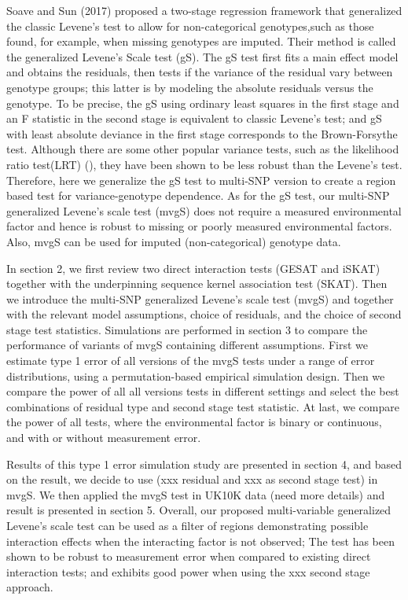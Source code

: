 \documentclass{article}
\begin{document}
	
	Soave and Sun (2017) proposed a two-stage regression framework that generalized the classic Levene's test to allow for non-categorical genotypes,such as those found, for example, when missing genotypes are imputed. Their method is called the generalized Levene's Scale test (gS). The gS test first fits a main effect model and obtains the residuals, then tests if the variance of the residual vary between genotype groups; this latter is by modeling the absolute residuals versus the genotype.  To be precise, the gS using ordinary least squares in the first stage and an F statistic in the second stage is equivalent to classic Levene's test; and gS with least absolute deviance  in the first stage corresponds to the Brown-Forsythe test. Although there are some other popular variance tests, such as the likelihood ratio test(LRT) (\cite{cao2014versatile}), they have been shown to be less robust than the Levene's test. Therefore, here we generalize the gS test to multi-SNP version to create a region based test for variance-genotype dependence. As for the gS test, our multi-SNP generalized Levene's scale test (mvgS) does not require a measured environmental factor and hence is robust to missing or poorly measured environmental factors. Also,  mvgS can be used for imputed (non-categorical) genotype data.
	
	
	
	In section 2, we first review two direct interaction tests (GESAT and iSKAT) together with the underpinning sequence kernel association test (SKAT). Then we introduce the multi-SNP generalized Levene's scale test (mvgS) and together with the relevant model assumptions, choice of residuals, and the choice of second stage test statistics.  Simulations are performed  in section 3 to compare the performance of variants of mvgS containing different assumptions. First we estimate type 1 error of all versions of the mvgS tests under a range of error distributions, using a permutation-based empirical simulation design. Then we compare the power of all all versions tests in different settings 
	and select the best combinations of residual type and second stage test statistic. At last, we compare the power of all tests,
	where the environmental factor is binary or continuous, and with or without measurement error. 
	
	Results of this type 1 error simulation study are presented in section 4, and based on the result, we decide to use (xxx residual and xxx as second stage test) in mvgS. We then applied the mvgS test in UK10K data (need more details) and result is presented in section 5. Overall, our proposed multi-variable generalized Levene's scale test can be used as a filter of regions demonstrating possible interaction effects when the interacting factor is not observed; The test has been shown to be  robust to measurement error when compared to  existing direct interaction tests; and exhibits good power when using the xxx second stage approach.
		
\end{document}

